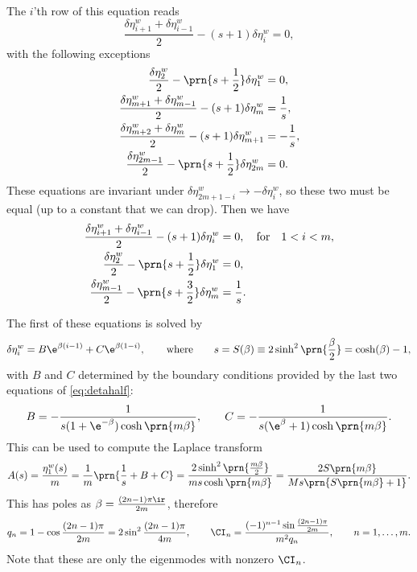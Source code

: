 \documentclass[12pt]{article}
\newcommand{\etwm}{\eta^w}
\begin{document}
The \(i\)'th row of this equation reads
%
\begin{equation}\label{eq:detarow}
  \frac{\delta\etwm_{i+1}+\delta\etwm_{i-1}}{2} - (s+1)\delta\etwm_i = 0,
\end{equation}
%
with the following exceptions
%
\begin{equation}\label{eq:detabnduni}
\begin{aligned}
  \frac{\delta\etwm_2}{2} - \prn{s+\frac{1}{2}}\delta\etwm_1 &= 0, \\
  \frac{\delta\etwm_{m+1}+\delta\etwm_{m-1}}{2} - (s+1)\delta\etwm_{m} &= \frac{1}{s},\\
  \frac{\delta\etwm_{m+2}+\delta\etwm_{m}}{2} - (s+1)\delta\etwm_{m+1} &= -\frac{1}{s},\\
  \frac{\delta\etwm_{2m-1}}{2} - \prn{s+\frac{1}{2}}\delta\etwm_{2m} &= 0.
\end{aligned}
\end{equation}
%
These equations are invariant under \(\delta\etwm_{2m+1-i} \to -\delta\etwm_i\), so these two must be equal (up to a constant that we can drop).
Then we have
%
\begin{equation}\label{eq:detahalf}
\begin{aligned}
  \frac{\delta\etwm_{i+1}+\delta\etwm_{i-1}}{2} - (s+1)\delta\etwm_i &= 0,
  \quad\text{for}\quad 1<i<m, \\
  \frac{\delta\etwm_2}{2} - \prn{s+\frac{1}{2}}\delta\etwm_1 &= 0, \\
  \frac{\delta\etwm_{m-1}}{2} - \prn{s+\frac{3}{2}}\delta\etwm_{m} &= \frac{1}{s}.
\end{aligned}
\end{equation}
%

The first of these equations is solved by
%
\begin{equation}\label{eq:detagensol}
  \delta\etwm_i = B\e^{\beta(i-1)} + C\e^{\beta(1-i)},
  \qquad\text{where}\qquad
  s = S(\beta) \equiv 2 \sinh^2 \prn{\frac{\beta}{2}}
    = \cosh (\beta) - 1,
\end{equation}
%
with \(B\) and \(C\) determined by the boundary conditions provided by the last two equations of \eqref{eq:detahalf}:
%
\begin{equation}\label{eq:unicoeffs}
  B = -\frac{1}{s(1 + \e^{-\beta}) \cosh \prn{m \beta}},
  \qquad
  C = -\frac{1}{s(\e^{\beta} + 1) \cosh \prn{m \beta}}.
\end{equation}
%
This can be used to compute the Laplace transform
%
\begin{equation}\label{eq:unilaplace}
  A(s) = \frac{\etwm_1(s)}{m}
   = \frac{1}{m}\prn{\frac{1}{s}+B+C}
   = \frac{2\sinh^2\prn{\frac{m \beta}{2}}}{m s \cosh\prn{m \beta}}
   = \frac{2 S\prn{m \beta}}{M s \prn{S\prn{m \beta} + 1}}.
\end{equation}
%
This has poles as \( \beta = \frac{(2n-1)\pi\ir}{2m} \), therefore
%
\begin{equation}\label{eq:unieig}
  q_n = 1 - \cos\frac{(2n-1)\pi}{2m} = 2 \sin^2\frac{(2n-1)\pi}{4m},
  \qquad
  \CI_n = \frac{(-1)^{n-1} \sin\frac{(2n-1)\pi}{2m}}{m^2 q_n},
  \qquad n = 1,\dots,m.
\end{equation}
%
Note that these are only the eigenmodes with nonzero \(\CI_n\).
\end{document}
